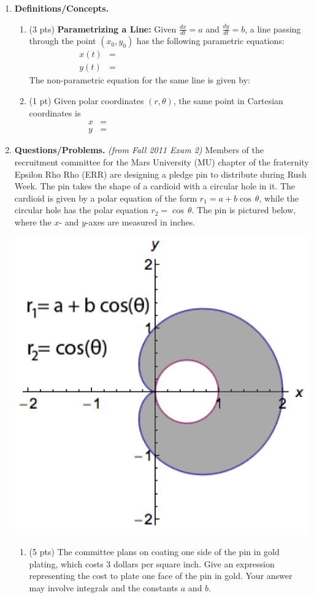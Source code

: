 \documentclass[11pt,letterpaper]{article}
\begin{document}
\begin{enumerate}
\item  \textbf{Definitions/Concepts.}
\begin{enumerate}
\item (3 pts) {\bf Parametrizing a Line:} Given $\frac{dx}{dt}=a$ and $\frac{dy}{dt}=b$, a line passing through the point $(x_0,y_0)$ has the following parametric equations:
\begin{align*}
x(t) &= \hspace{200pt}\\
y(t) &= 
\end{align*}
The non-parametric equation for the same line is given by:

\vspace{3pc}
\item (1 pt) Given polar coordinates $(r,\theta)$, the same point in Cartesian coordinates is 
\begin{align*}
x &= \hspace{200pt}\\
y &= 
\end{align*}
\end{enumerate}

 
\item \textbf{Questions/Problems.} {\it (from Fall 2011 Exam 2)} Members of the recruitment committee for the Mars University (MU) chapter of the fraternity Epsilon Rho Rho (ERR) are designing a pledge pin to distribute during Rush Week.  The pin takes the shape of a cardioid with a circular hole in it.  The cardioid is given by a polar equation of the form $r_1=a+b\cos\,\theta$, while the circular hole has the polar equation $r_2=\cos\,\theta$.  The pin is pictured below, where the $x$- and $y$-axes are measured in inches.
\smallskip
\begin{center}
\includegraphics[width=.35\textwidth]{quiz6pic.png}
\end{center}
\begin{enumerate}
\item (5 pts) The committee plans on coating one side of the pin in gold plating, which costs 3 dollars per square inch.  Give an expression representing the cost to plate one face of the pin in gold.  Your answer may involve integrals and the constants $a$ and $b$.


\end{enumerate}
\end{enumerate}
\end{document}
